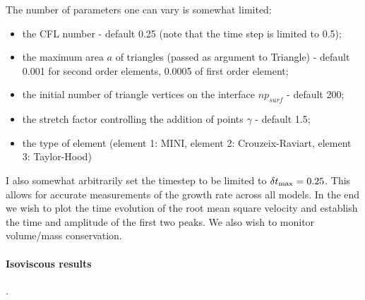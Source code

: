 The number of parameters one can vary is somewhat limited:
\begin{itemize}
\item the CFL number - default 0.25 (note that the time step is limited to 0.5);
\item the maximum area $a$ of triangles (passed as argument to Triangle) - default 0.001 for second order elements,
0.0005 of first order element;
\item the initial number of triangle vertices on the interface $np_{surf}$ - default 200;
\item the stretch factor controlling the addition of points $\gamma$ - default 1.5;
\item the type of element (element 1: MINI, element 2: Crouzeix-Raviart, element 3: Taylor-Hood)  
\end{itemize}

I also somewhat arbitrarily set the timestep to be limited to $\delta t_{\rm max}=0.25$. This allows for accurate 
measurements of the growth rate across all models. 
In the end we wish to plot the time evolution of the root mean square velocity and 
establish the time and amplitude of the first two peaks. We also wish to monitor volume/mass conservation.  

\newpage
\paragraph{Isoviscous results}.

